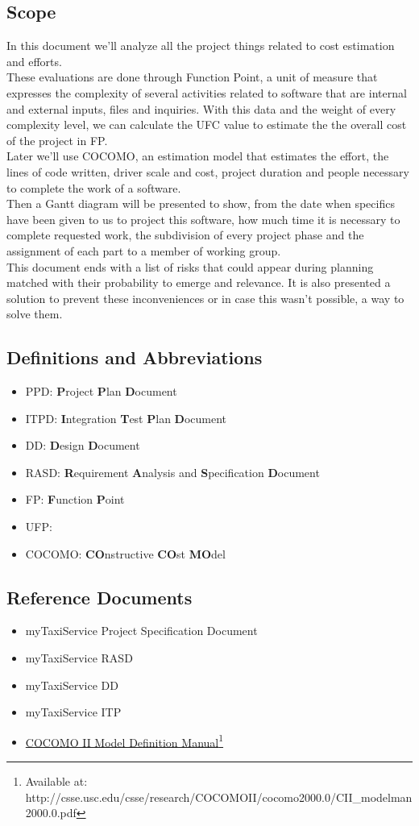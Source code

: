 \subsection{Scope}
In this document we'll analyze all the project things related to cost estimation and efforts.\\
These evaluations are done through Function Point, a unit of measure that expresses the complexity of several activities related to software that are internal and external inputs, files and inquiries. With this data and the weight of every complexity level, we can calculate the UFC value to estimate the the overall cost of the project in FP.\\ 
Later we'll use COCOMO, an estimation model that estimates the effort, the lines of code written, driver scale and cost, project duration and people necessary to complete the work of a software.\\
Then a Gantt diagram will be presented to show, from the date when specifics have been given to us to project this software, how much time it is necessary to complete requested work, the subdivision of every project phase and the assignment of each part to a member of working group.\\
This document ends with a list of risks that could appear during planning matched with their probability to emerge and relevance. It is also presented a solution to prevent these inconveniences or in case this wasn't possible, a way to solve them.
\subsection{Definitions and Abbreviations}
\begin{itemize}
	\item PPD: \textbf{P}roject \textbf{P}lan \textbf{D}ocument
	\item ITPD: \textbf{I}ntegration \textbf{T}est \textbf{P}lan \textbf{D}ocument
	\item DD: \textbf{D}esign \textbf{D}ocument
	\item RASD: \textbf{R}equirement \textbf{A}nalysis and \textbf{S}pecification \textbf{D}ocument
	\item FP: \textbf{F}unction \textbf{P}oint
	\item UFP: 
	\item COCOMO: \textbf{CO}nstructive \textbf{CO}st \textbf{MO}del
\end{itemize}
\subsection{Reference Documents}
\begin{itemize}
	\item myTaxiService Project Specification Document
	\item myTaxiService RASD
	\item myTaxiService DD
	\item myTaxiService ITP
	\item \href{http://csse.usc.edu/csse/research/COCOMOII/cocomo2000.0/CII\_modelman2000.0.pdf}{COCOMO II Model Definition Manual}\footnote{Available at: http://csse.usc.edu/csse/research/COCOMOII/cocomo2000.0/CII\_modelman2000.0.pdf}
\end{itemize}